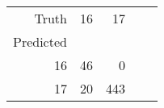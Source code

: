 \begin{tabular}{rrrrr}
\toprule
Truth & 16 & 17 \\
Predicted &  &  \\
\midrule
16 & 46 & 0 \\
17 & 20 & 443 \\
\bottomrule
\end{tabular}
